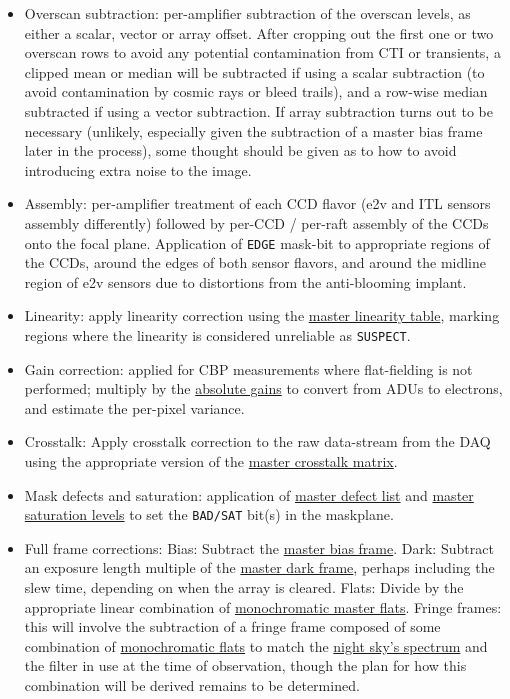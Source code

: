 \begin{itemize}

\item Overscan subtraction: per-amplifier subtraction of the overscan levels, as either a scalar, vector or array offset. After cropping out the first one or two overscan rows to avoid any potential contamination from CTI or transients, a clipped mean or median will be subtracted if using a scalar subtraction (to avoid contamination by cosmic rays or bleed trails), and a row-wise median subtracted if using a vector subtraction. If array subtraction turns out to be necessary (unlikely, especially given the subtraction of a master bias frame later in the process), some thought should be given as to how to avoid introducing extra noise to the image.

\item Assembly: per-amplifier treatment of each CCD flavor (e2v and ITL sensors assembly differently) followed by per-CCD / per-raft assembly of the CCDs onto the focal plane. Application of \texttt{EDGE} mask-bit to appropriate regions of the CCDs, \ie around the edges of both sensor flavors, and around the midline region of e2v sensors due to distortions from the anti-blooming implant.

\item Linearity: apply linearity correction using the \hyperref[sec:CPP:output:linearityCurve]{master linearity table}, marking
regions where the linearity is considered unreliable as \texttt{SUSPECT}.

\item Gain correction: applied for CBP measurements where flat-fielding is not performed; multiply by the \hyperref[sec:CPP:output:gains]{absolute gains} to convert from ADUs to electrons, and estimate the per-pixel variance.

\item Crosstalk: Apply crosstalk correction to the raw data-stream from the DAQ using the appropriate version of the \hyperref[sec:CPP:output:crosstalk]{master crosstalk matrix}.

\item Mask defects and saturation: application of \hyperref[sec:CPP:output:defectList]{master defect list} and \hyperref[sec:CPP:output:saturationLevel]{master saturation levels} to set the \texttt{BAD/SAT} bit(s) in the maskplane.

\item Full frame corrections:	
	\mysubitem Bias: Subtract the \hyperref[sec:CPP:output:bias]{master bias frame}.
	\mysubitem Dark: Subtract an exposure length multiple of the \hyperref[sec:CPP:output:dark]{master dark frame}, perhaps including the slew time, depending on when the array is cleared.
	\mysubitem Flats: Divide by the appropriate linear combination of  \hyperref[sec:CPP:output:monoPhotoFlat]{monochromatic master flats}.
	\mysubitem Fringe frames: this will involve the subtraction of a fringe frame composed of some combination of \hyperref[sec:CPP:output:monoFlat]{monochromatic flats} to match the \hyperref[sec:CPP:aux:nightSkySpectrum]{night sky's spectrum} and the filter in use at the time of observation, though the plan for how this combination will be derived remains to be determined.



\end{itemize}
